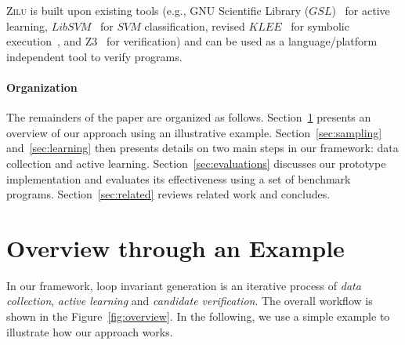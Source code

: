     \textsc{Zilu} is built upon existing tools (e.g., GNU Scientific Library ($\mathit{GSL}$)~\cite{gough2009gnu} for active learning,
    $\mathit{LibSVM}$~\cite{chang2011libsvm} for $\mathit{SVM}$ classification,
    revised $\mathit{KLEE}$~\cite{cadar2008klee} for symbolic execution~\cite{king1976symbolic,symbolic}, and Z3~\cite{de2008z3} for verification) and 
    can be used as a language/platform independent tool to verify programs.

\paragraph{Organization} The remainders of the paper are organized as follows. Section~\ref{sec:overview} presents an overview of our approach using an illustrative example. Section~\ref{sec:sampling} and~\ref{sec:learning} then presents details on two main steps in our framework: data collection and active learning. Section~\ref{sec:evaluations} discusses our prototype implementation and evaluates its effectiveness using a set of benchmark programs. Section~\ref{sec:related} reviews related work and concludes.

\section{Overview through an Example} \label{sec:overview}
In our framework, loop invariant generation is an iterative process of \emph{data collection}, \emph{active learning} and \emph{candidate verification}. The overall workflow is shown in the Figure~\ref{fig:overview}. In the following, we use a simple example to illustrate how our approach works.

